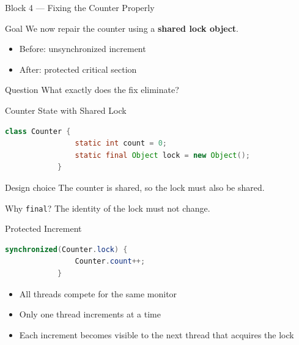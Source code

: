 \documentclass[aspectratio=169,11pt]{beamer}
\begin{document}
	\begin{frame}{Block 4 --- Fixing the Counter Properly}
		\begin{block}{Goal}
			We now repair the counter using a \textbf{shared lock object}.
		\end{block}
		
		\bigskip
		
		\begin{itemize}
			\item Before: unsynchronized increment
			\item After: protected critical section
		\end{itemize}
		
		\bigskip
		
		\begin{alertblock}{Question}
			What exactly does the fix eliminate?
		\end{alertblock}
	\end{frame}
	
	\begin{frame}[fragile]{Counter State with Shared Lock}
		\begin{lstlisting}[language=Java]
			class Counter {
				static int count = 0;
				static final Object lock = new Object();
			}
		\end{lstlisting}
		
		\vspace{0.3cm}
		
		\begin{block}{Design choice}
			The counter is shared, so the lock must also be shared.
		\end{block}
		
		\begin{alertblock}{Why \texttt{final}?}
			The identity of the lock must not change.
		\end{alertblock}
	\end{frame}
	
	\begin{frame}[fragile]{Protected Increment}
		\begin{lstlisting}[language=Java]
			synchronized(Counter.lock) {
				Counter.count++;
			}
		\end{lstlisting}
		
		\vspace{0.3cm}
		
		\begin{itemize}
			\item All threads compete for the same monitor
			\item Only one thread increments at a time
			\item Each increment becomes visible to the next thread that acquires the lock
		\end{itemize}
	\end{frame}
	
\end{document}
